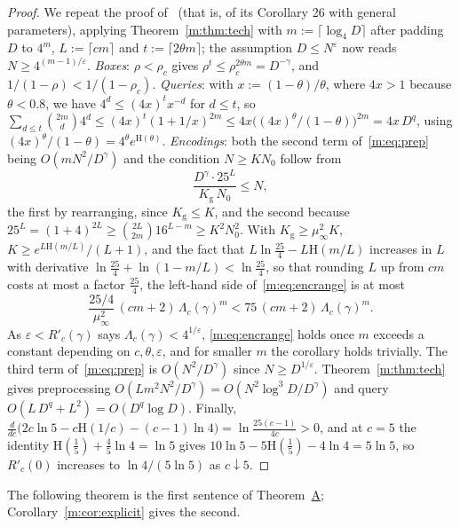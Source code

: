 \documentclass[11pt]{article}
\theoremstyle{definition}
\theoremstyle{remark}
\newcommand{\Hh}{\mathrm{H}}
\newcommand{\Nz}{N_0}
\newcommand{\Kg}{K_{\mathrm g}}
\begin{document}
\begin{proof}
We repeat the proof of~\cite[Corollary 31]{ZT} (that is, of its Corollary 26 with general parameters), applying Theorem~\ref{m:thm:tech} with $m:=\lceil\log_4D\rceil$ after padding $D$ to $4^m$, $L:=\lceil cm\rceil$ and $t:=\lceil2\theta m\rceil$; the assumption $D\le N^\varepsilon$ now reads $N\ge4^{(m-1)/\varepsilon}$. \emph{Boxes}: $\rho<\rho_c$ gives $\rho^t\le\rho_c^{2\theta m}=D^{-\gamma}$, and $1/(1-\rho)<1/(1-\rho_c)$. \emph{Queries}: with $x:=(1-\theta)/\theta$, where $4x>1$ because $\theta<0.8$, we have $4^d\le(4x)^tx^{-d}$ for $d\le t$, so $\sum_{d\le t}\binom{2m}d4^d\le(4x)^t(1+1/x)^{2m}\le4x\big((4x)^\theta/(1-\theta)\big)^{2m}=4x\,D^q$, using $(4x)^\theta/(1-\theta)=4^\theta e^{\Hh(\theta)}$. \emph{Encodings}: both the second term of~\eqref{m:eq:prep} being $O(mN^2/D^\gamma)$ and the condition $N\ge K\Nz$ follow from
\begin{equation}\label{m:eq:encrange}
\frac{D^\gamma\cdot25^L}{\Kg\,\Nz}\le N,
\end{equation}
the first by rearranging, since $\Kg\le K$, and the second because $25^L=(1+4)^{2L}\ge\binom{2L}{2m}16^{L-m}\ge K^2\Nz^2$. With $\Kg\ge\mu_\infty^2 K$, $K\ge e^{L\Hh(m/L)}/(L+1)$, and the fact that $L\ln\frac{25}4-L\Hh(m/L)$ increases in $L$ with derivative $\ln\frac{25}4+\ln(1-m/L)<\ln\frac{25}4$, so that rounding $L$ up from $cm$ costs at most a factor $\frac{25}4$, the left-hand side of~\eqref{m:eq:encrange} is at most
\begin{equation}\label{m:eq:lhs}
\frac{25/4}{\mu_\infty^2}\,(cm+2)\,\Lambda_c(\gamma)^m<75\,(cm+2)\,\Lambda_c(\gamma)^m .
\end{equation}
As $\varepsilon<R'_c(\gamma)$ says $\Lambda_c(\gamma)<4^{1/\varepsilon}$, \eqref{m:eq:encrange} holds once $m$ exceeds a constant depending on $c,\theta,\varepsilon$, and for smaller $m$ the corollary holds trivially. The third term of~\eqref{m:eq:prep} is $O(N^2/D^\gamma)$ since $N\ge D^{1/\varepsilon}$. Theorem~\ref{m:thm:tech} gives preprocessing $O(Lm^2N^2/D^\gamma)=O(N^2\log^3\!D/D^\gamma)$ and query $O(L\,D^q+L^2)=O(D^q\log D)$. Finally, $\frac{d}{dc}\big(2c\ln5-c\Hh(1/c)-(c-1)\ln4\big)=\ln\frac{25(c-1)}{4c}>0$, and at $c=5$ the identity $\Hh(\frac15)+\frac45\ln4=\ln5$ gives $10\ln5-5\Hh(\frac15)-4\ln4=5\ln5$, so $R'_c(0)$ increases to $\ln4/(5\ln5)$ as $c\downarrow5$.
\end{proof}

The following theorem is the first sentence of Theorem~\hyperref[m:introA]{A}; Corollary~\ref{m:cor:explicit} gives the second.
\end{document}
